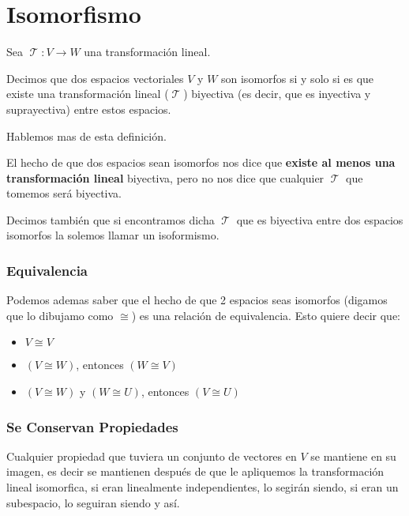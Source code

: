 \documentclass[12pt]{report}                                    %
\DeclareMathOperator \LinealTransformation {\mathcal{T}}        %
\DeclareMathOperator \LT {\mathcal{T}}                          %
\begin{document}
    \clearpage
    \section{Isomorfismo}
        Sea $\LinealTransformation : V \to W $ una transformación lineal.

        Decimos que dos espacios vectoriales $V$ y $W$ son isomorfos si y solo si es que existe
        una transformación lineal ($\LT$) biyectiva (es decir, que es inyectiva y suprayectiva)
        entre estos espacios.

        Hablemos mas de esta definición.

        El hecho de que dos espacios sean isomorfos nos dice que \textbf{existe al menos una transformación lineal}
        biyectiva, pero no nos dice que cualquier $\LT$ que tomemos será biyectiva.

        Decimos también que si encontramos dicha $\LT$ que es biyectiva entre dos espacios isomorfos la solemos
        llamar un isoformismo.

        \subsubsection{Equivalencia}

        Podemos ademas saber que el hecho de que 2 espacios seas isomorfos
        (digamos que lo dibujamo como $\cong$) es una relación de equivalencia.
        Esto quiere decir que:

        \begin{itemize}
            \item $V \cong V$
            \item $(V \cong W)$, entonces $(W \cong V)$
            \item $(V \cong W)$ y $(W \cong U)$, entonces $(V \cong U)$
        \end{itemize}


        \subsubsection{Se Conservan Propiedades}

        Cualquier propiedad que tuviera un conjunto de vectores en $V$ se mantiene
        en su imagen, es decir se mantienen después de que le apliquemos la
        transformación lineal isomorfica, si eran linealmente independientes, lo segirán siendo,
        si eran un subespacio, lo seguiran siendo y así.
\end{document}

